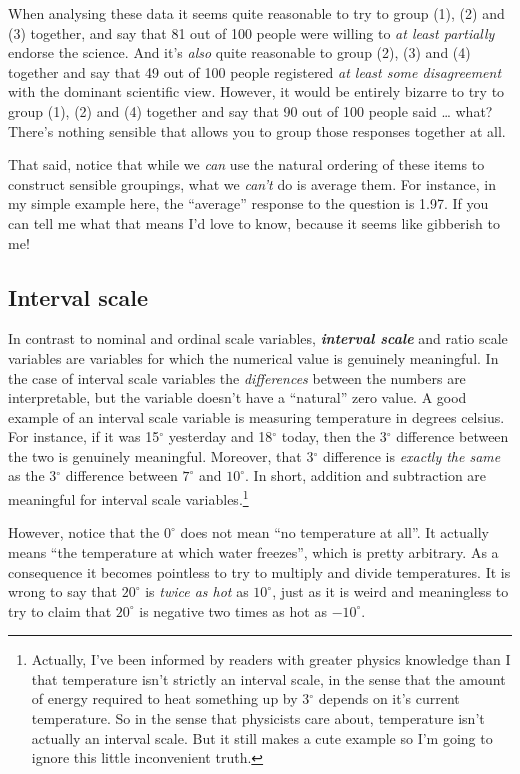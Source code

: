 \documentclass[
]{book}
\begin{document}
When analysing these data it seems quite reasonable to try to group (1), (2) and (3) together, and say that 81 out of 100 people were willing to \emph{at least partially} endorse the science. And it's \emph{also} quite reasonable to group (2), (3) and (4) together and say that 49 out of 100 people registered \emph{at least some disagreement} with the dominant scientific view. However, it would be entirely bizarre to try to group (1), (2) and (4) together and say that 90 out of 100 people said \ldots{} what? There's nothing sensible that allows you to group those responses together at all.

That said, notice that while we \emph{can} use the natural ordering of these items to construct sensible groupings, what we \emph{can't} do is average them. For instance, in my simple example here, the ``average'' response to the question is 1.97. If you can tell me what that means I'd love to know, because it seems like gibberish to me!

\hypertarget{interval-scale}{%
\subsection{Interval scale}\label{interval-scale}}

In contrast to nominal and ordinal scale variables, \textbf{\emph{interval scale}} and ratio scale variables are variables for which the numerical value is genuinely meaningful. In the case of interval scale variables the \emph{differences} between the numbers are interpretable, but the variable doesn't have a ``natural'' zero value. A good example of an interval scale variable is measuring temperature in degrees celsius. For instance, if it was 15\(^\circ\) yesterday and 18\(^\circ\) today, then the 3\(^\circ\) difference between the two is genuinely meaningful. Moreover, that 3\(^\circ\) difference is \emph{exactly the same} as the 3\(^\circ\) difference between \(7^\circ\) and \(10^\circ\). In short, addition and subtraction are meaningful for interval scale variables.\footnote{Actually, I've been informed by readers with greater physics knowledge than I that temperature isn't strictly an interval scale, in the sense that the amount of energy required to heat something up by 3\(^\circ\) depends on it's current temperature. So in the sense that physicists care about, temperature isn't actually an interval scale. But it still makes a cute example so I'm going to ignore this little inconvenient truth.}

However, notice that the \(0^\circ\) does not mean ``no temperature at all''. It actually means ``the temperature at which water freezes'', which is pretty arbitrary. As a consequence it becomes pointless to try to multiply and divide temperatures. It is wrong to say that \(20^\circ\) is \emph{twice as hot} as \(10^\circ\), just as it is weird and meaningless to try to claim that \(20^\circ\) is negative two times as hot as \(-10^\circ\).
\end{document}
